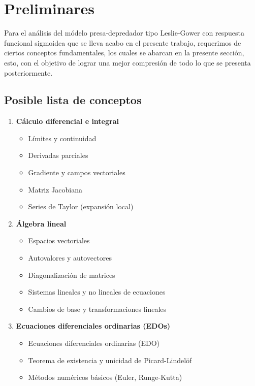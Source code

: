\chapter{Preliminares}
    Para el análisis del módelo presa-depredador tipo Leslie-Gower con respuesta funcional sigmoidea que se lleva acabo en el presente trabajo, requerimos de ciertos conceptos fundamentales, los cuales se abarcan en la presente sección, esto, con el objetivo de lograr una mejor compresión de todo lo que se presenta posteriormente.
    
    \section*{Posible lista de conceptos}
    
    \begin{enumerate}
    	\item \textbf{Cálculo diferencial e integral}
    	\begin{itemize}
    		\item Límites y continuidad
    		\item Derivadas parciales
    		\item Gradiente y campos vectoriales
    		\item Matriz Jacobiana
    		\item Series de Taylor (expansión local)
    	\end{itemize}
    	
    	\item \textbf{Álgebra lineal}
    	\begin{itemize}
    		\item Espacios vectoriales
    		\item Autovalores y autovectores
    		\item Diagonalización de matrices
    		\item Sistemas lineales y no lineales de ecuaciones
    		\item Cambios de base y transformaciones lineales
    	\end{itemize}
    	
    	\item \textbf{Ecuaciones diferenciales ordinarias (EDOs)}
    	\begin{itemize}
    		\item Ecuaciones diferenciales ordinarias (EDO) \checkmark
    		\item Teorema de existencia y unicidad de Picard-Lindelöf
    		\item Métodos numéricos básicos (Euler, Runge-Kutta)
    	\end{itemize}
    	

\end{enumerate}
